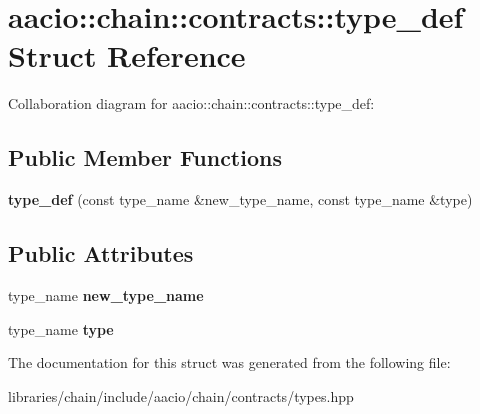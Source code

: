 \hypertarget{structaacio_1_1chain_1_1contracts_1_1type__def}{}\section{aacio\+:\+:chain\+:\+:contracts\+:\+:type\+\_\+def Struct Reference}
\label{structaacio_1_1chain_1_1contracts_1_1type__def}


Collaboration diagram for aacio\+:\+:chain\+:\+:contracts\+:\+:type\+\_\+def\+:
\subsection*{Public Member Functions}
\begin{DoxyCompactItemize}
\item 
\mbox{\label{structaacio_1_1chain_1_1contracts_1_1type__def_a23f138523845b4c36408bd834ea180fa}} 
{\bfseries type\+\_\+def} (const type\+\_\+name \&new\+\_\+type\+\_\+name, const type\+\_\+name \&type)
\end{DoxyCompactItemize}
\subsection*{Public Attributes}
\begin{DoxyCompactItemize}
\item 
\mbox{\label{structaacio_1_1chain_1_1contracts_1_1type__def_a02ed818be45d54b2e91bfa04d29e246a}} 
type\+\_\+name {\bfseries new\+\_\+type\+\_\+name}
\item 
\mbox{\label{structaacio_1_1chain_1_1contracts_1_1type__def_a8fa1806c1c8114bba4005724cf9ee3ae}} 
type\+\_\+name {\bfseries type}
\end{DoxyCompactItemize}


The documentation for this struct was generated from the following file\+:\begin{DoxyCompactItemize}
\item 
libraries/chain/include/aacio/chain/contracts/types.\+hpp\end{DoxyCompactItemize}
